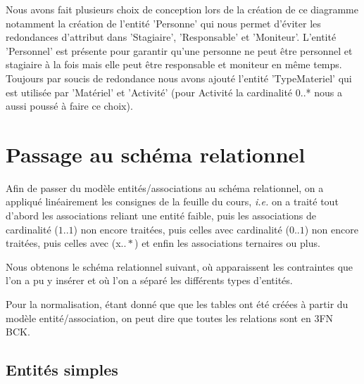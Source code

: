 \documentclass[10pt]{article}
\begin{document}
Nous avons fait plusieurs choix de conception lors de la création de ce diagramme notamment la création de l'entité 'Personne' qui nous permet d'éviter les redondances d'attribut dans 'Stagiaire', 'Responsable' et 'Moniteur'. L'entité 'Personnel' est présente pour garantir qu'une personne ne peut être personnel et stagiaire à la fois mais elle peut être responsable et moniteur en même temps.
Toujours par soucis de redondance nous avons ajouté l'entité 'TypeMateriel' qui est utilisée par 'Matériel' et 'Activité' (pour Activité la cardinalité 0..* nous a aussi poussé à faire ce choix). 
\section{Passage au schéma relationnel}

Afin de passer du modèle entités/associations au schéma relationnel, on a appliqué linéairement les consignes de la feuille du cours,
\emph{i.e.} on a traité tout d'abord les associations reliant une entité faible, puis les associations de cardinalité ($1..1$) non encore
traitées, puis celles avec cardinalité ($0..1$) non encore traitées, puis celles avec (x$..*$) et enfin les associations ternaires ou plus.

Nous obtenons le schéma relationnel suivant, où apparaissent les contraintes que l'on a pu y insérer et où l'on a séparé les différents
types d'entités.

Pour la normalisation, étant donné que que les tables ont été créées à partir du modèle entité/association, on peut dire que
toutes les relations sont en 3FN BCK.

\subsection{Entités simples}
\end{document}
